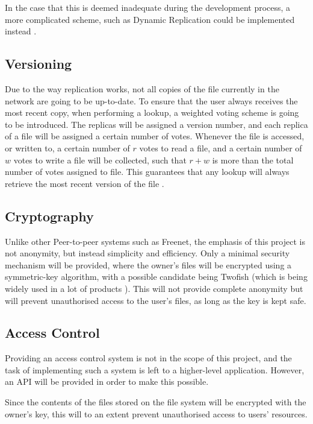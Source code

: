 \documentclass[8pt,a4paper]{article}
\begin{document}
In the case that this is deemed inadequate during the development process, a more complicated scheme, such as Dynamic Replication could be implemented instead \cite{dhash}.

\subsection{Versioning}
Due to the way replication works, not all copies of the file currently in the network are going to be up-to-date. To ensure that the user always receives the most recent copy, when performing a lookup, a weighted voting scheme is going to be introduced. The replicas will be assigned a version number, and each replica of a file will be assigned a certain number of votes. Whenever the file is accessed, or written to, a certain number of $r$ votes to read a file, and a certain number of $w$ votes to write a file will be collected, such that $r + w$ is more than the total number of votes assigned to file. This guarantees that any lookup will always retrieve the most recent version of the file \cite{versioning}.

\subsection{Cryptography}

Unlike other Peer-to-peer systems such as Freenet, the emphasis of this project is not anonymity, but instead simplicity and efficiency. Only a minimal security mechanism will be provided, where the owner's files will be encrypted using a symmetric-key algorithm, with a possible candidate being Twofish (which is being widely used in a lot of products \cite{twofishprod}).
This will not provide complete anonymity but will prevent unauthorised access to the user's files, as long as the key is kept safe.

\subsection{Access Control}

Providing an access control system is not in the scope of this project, and the task of implementing such a system is left to a higher-level application. However, an API will be provided in order to make this possible. 

Since the contents of the files stored on the file system will be encrypted with the owner's key, this will to an extent prevent unauthorised access to users' resources.
\end{document}
